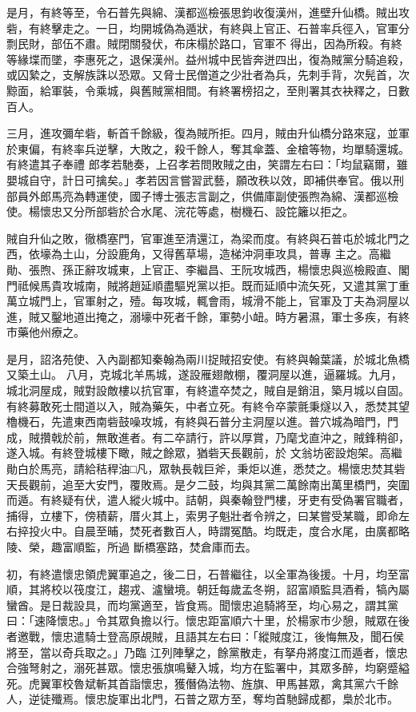 \begin{pinyinscope}
 是月，有終等至，令石普先與綿、漢都巡檢張思鈞收復漢州，進壁升仙橋。賊出攻砦，有終擊走之。一日，均開城偽為遁狀，有終與上官正、石普率兵徑入，官軍分剽民財，部伍不肅。賊閉關發伏，布床榻於路口，官軍不
 得出，因為所殺。有終等緣堞而墜，李惠死之，退保漢州。益州城中民皆奔迸四出，復為賊黨分騎追殺，或囚縶之，支解族誅以恐眾。又脅士民僧道之少壯者為兵，先刺手背，次髡首，次黥面，給軍裝，令乘城，與舊賊黨相間。有終署榜招之，至則署其衣袂釋之，日數百人。



 三月，進攻彌牟砦，斬首千餘級，復為賊所拒。四月，賊由升仙橋分路來寇，並軍於東偏，有終率兵逆擊，大敗之，殺千餘人，奪其傘蓋、金槍等物，均單騎還城。有終遣其子奉禮
 郎孝若馳奏，上召孝若問敗賊之由，笑謂左右曰：「均鼠竊爾，雖嬰城自守，計日可擒矣。」孝若因言嘗習武藝，願改秩以效，即補供奉官。俄以刑部員外郎馬亮為轉運使，國子博士張志言副之，供備庫副使張煦為綿、漢都巡檢使。楊懷忠又分所部砦於合水尾、浣花等處，樹機石、設笓籬以拒之。



 賊自升仙之敗，徹橋塞門，官軍進至清還江，為梁而度。有終與石普屯於城北門之西，依壕為土山，分設鹿角，又得舊草場，造梯沖洞車攻具，普專
 主之。高繼勛、張煦、孫正辭攻城東，上官正、李繼昌、王阮攻城西，楊懷忠與巡檢殿直、閣門祗候馬貴攻城南，賊將趙延順盡驅兇黨以拒。既而延順中流矢死，又遣其黨丁重萬立城門上，官軍射之，殪。每攻城，輒會雨，城滑不能上，官軍及丁夫為洞屋以進，賊又鑿地道出掩之，溺壕中死者千餘，軍勢小衄。時方暑濕，軍士多疾，有終市藥他州療之。



 是月，詔洛苑使、入內副都知秦翰為兩川捉賊招安使。有終與翰葉議，於城北魚橋又築土山。
 八月，克城北羊馬城，遂設雁翅敵棚，覆洞屋以進，逼羅城。九月，城北洞屋成，賊對設敵樓以抗官軍，有終遣卒焚之，賊自是銷沮，築月城以自固。有終募敢死士間道以入，賊為藥矢，中者立死。有終令卒蒙氈秉燧以入，悉焚其望櫓機石，先遣東西南砦鼓噪攻城，有終與石普分主洞屋以進。普穴城為暗門，門成，賊攢戟於前，無敢進者。有二卒請行，許以厚賞，乃麾戈直沖之，賊鋒稍卻，遂入城。有終登城樓下瞰，賊之餘眾，猶砦天長觀前，於
 文翁坊密設炮架。高繼勛白於馬亮，請給秸稈油□凡，眾執長戟巨斧，秉炬以進，悉焚之。楊懷忠焚其砦天長觀前，追至大安門，覆敗焉。是夕二鼓，均與其黨二萬餘南出萬里橋門，突圍而遁。有終疑有伏，遣人縱火城中。詰朝，與秦翰登門樓，牙吏有受偽署官職者，捕得，立樓下，傍積薪，厝火其上，索男子魁壯者令辨之，曰某嘗受某職，即命左右捽投火中。自晨至晡，焚死者數百人，時謂冤酷。均既走，度合水尾，由廣都略陵、榮，趣富順監，所過
 斷橋塞路，焚倉庫而去。



 初，有終遣懷忠領虎翼軍追之，後二日，石普繼往，以全軍為後援。十月，均至富順，其將校以筏度江，趨戎、瀘蠻境。朝廷每歲孟冬朔，詔富順監具酒肴，犒內屬蠻酋。是日裁設具，而均黨適至，皆食焉。聞懷忠追騎將至，均心易之，謂其黨曰：「速降懷忠。」令其眾負擔以行。懷忠距富順六十里，於楊家市少憩，賊眾在後者邀戰，懷忠遣騎士登高原覘賊，且語其左右曰：「縱賊度江，後悔無及，聞石侯將至，當以奇兵取之。」乃臨
 江列陣擊之，餘黨散走，有拏舟將度江而遁者，懷忠合強弩射之，溺死甚眾。懷忠張旗鳴鼙入城，均方在監署中，其眾多醉，均窮蹙縊死。虎翼軍校魯斌斬其首詣懷忠，獲僭偽法物、旌旗、甲馬甚眾，禽其黨六千餘人，逆徒殲焉。懷忠旋軍出北門，石普之眾方至，奪均首馳歸成都，梟於北市。




\end{pinyinscope}
